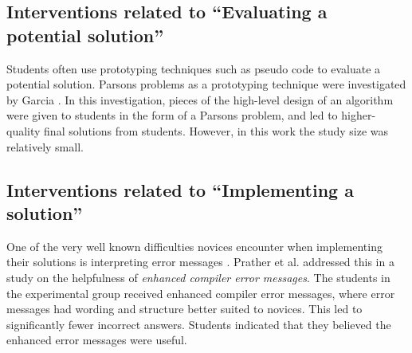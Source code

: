 \documentclass[sigconf,anonymous]{acmart}
\begin{document}
\subsection{Interventions related to ``Evaluating a potential solution''} \label{sec:relatedwork-evaluating}
Students often use prototyping techniques such as pseudo code to evaluate a potential solution. Parsons problems as a prototyping technique were investigated by Garcia \cite{garcia2021}. In this investigation, pieces of the high-level design of an algorithm were given to students in the form of a Parsons problem, and led to higher-quality final solutions from students. However, in this work the study size was relatively small.

\subsection{Interventions related to ``Implementing a solution''} \label{sec:relatedwork-implementing}
One of the very well known difficulties novices encounter when implementing their solutions is interpreting error messages \cite{becker2019compiler}. Prather et al. addressed this in a study on the helpfulness of \emph{enhanced compiler error messages}. The students in the experimental group received enhanced compiler error messages, where error messages had wording and structure better suited to novices. This led to significantly fewer incorrect answers. Students indicated that they believed the enhanced error messages were useful.
\end{document}
